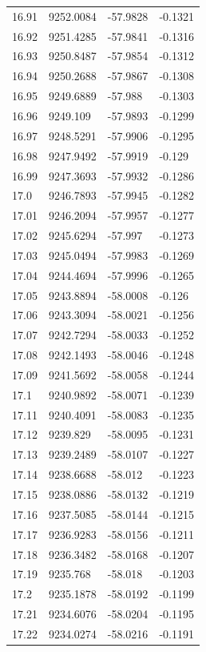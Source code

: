 \begin{table}[H]
\begin{tabular}{llll}
16.91 & 9252.0084 & -57.9828 & -0.1321 \\
16.92 & 9251.4285 & -57.9841 & -0.1316 \\
16.93 & 9250.8487 & -57.9854 & -0.1312 \\
16.94 & 9250.2688 & -57.9867 & -0.1308 \\
16.95 & 9249.6889 & -57.988 & -0.1303 \\
16.96 & 9249.109 & -57.9893 & -0.1299 \\
16.97 & 9248.5291 & -57.9906 & -0.1295 \\
16.98 & 9247.9492 & -57.9919 & -0.129 \\
16.99 & 9247.3693 & -57.9932 & -0.1286 \\
17.0 & 9246.7893 & -57.9945 & -0.1282 \\
17.01 & 9246.2094 & -57.9957 & -0.1277 \\
17.02 & 9245.6294 & -57.997 & -0.1273 \\
17.03 & 9245.0494 & -57.9983 & -0.1269 \\
17.04 & 9244.4694 & -57.9996 & -0.1265 \\
17.05 & 9243.8894 & -58.0008 & -0.126 \\
17.06 & 9243.3094 & -58.0021 & -0.1256 \\
17.07 & 9242.7294 & -58.0033 & -0.1252 \\
17.08 & 9242.1493 & -58.0046 & -0.1248 \\
17.09 & 9241.5692 & -58.0058 & -0.1244 \\
17.1 & 9240.9892 & -58.0071 & -0.1239 \\
17.11 & 9240.4091 & -58.0083 & -0.1235 \\
17.12 & 9239.829 & -58.0095 & -0.1231 \\
17.13 & 9239.2489 & -58.0107 & -0.1227 \\
17.14 & 9238.6688 & -58.012 & -0.1223 \\
17.15 & 9238.0886 & -58.0132 & -0.1219 \\
17.16 & 9237.5085 & -58.0144 & -0.1215 \\
17.17 & 9236.9283 & -58.0156 & -0.1211 \\
17.18 & 9236.3482 & -58.0168 & -0.1207 \\
17.19 & 9235.768 & -58.018 & -0.1203 \\
17.2 & 9235.1878 & -58.0192 & -0.1199 \\
17.21 & 9234.6076 & -58.0204 & -0.1195 \\
17.22 & 9234.0274 & -58.0216 & -0.1191 \\

\end{tabular}
\end{table}
